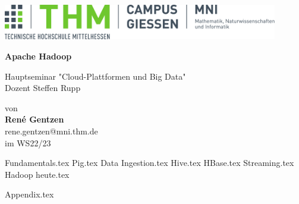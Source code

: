 \documentclass[%
	BCOR=8.25mm,         %
	DIV=12,              %
	parskip=half,		 %
	bibliography=totoc,	 %
	headsepline=on,      %
	]{scrbook}
\begin{document}
\frontmatter

\begin{titlepage}
	\begin{center}
	\includegraphics[width=0.9\textwidth]{mni-logo}
	
	\vspace{5cm}	

	\vspace{1cm}	

	\huge\textbf{\sffamily Apache Hadoop}

	\normalsize
	\vspace{1cm}	

	Hauptseminar "Cloud-Plattformen und Big Data" \\
	Dozent Steffen Rupp

	von \\[1cm]	

	\textbf{René Gentzen}\\ [.5cm] 
	rene.gentzen@mni.thm.de\\ [.5cm] 
	im WS22/23
	\end{center}
	\vfill
\end{titlepage}

\tableofcontents
\listoffigures

\mainmatter 
\pagestyle{headings}
{Fundamentals.tex}
{Pig.tex}
{Data Ingestion.tex}
{Hive.tex}
{HBase.tex}
{Streaming.tex}
{Hadoop heute.tex}

\backmatter 

\appendix
{Appendix.tex}
\printbibliography
\end{document}

